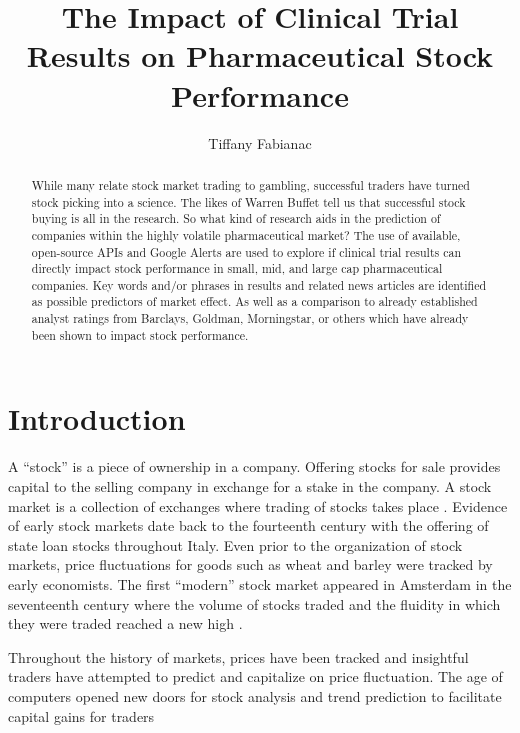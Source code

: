 \documentclass[sigconf]{acmart}
\begin{document}
\title{The Impact of Clinical Trial Results on Pharmaceutical Stock Performance}

\author{Tiffany Fabianac} 
 \renewcommand{\shortauthors}{T. Fabianac} 

\begin{abstract}
While many relate stock market trading to gambling, successful traders have turned stock picking into a science. The likes of Warren Buffet tell us that successful stock buying is all in the research. So what kind of research aids in the prediction of companies within the highly volatile pharmaceutical market? The use of available, open-source APIs and Google Alerts are used to explore if clinical trial results can directly impact stock performance in small, mid, and large cap pharmaceutical companies. Key words and/or phrases in results and related news articles are identified as possible predictors of market effect. As well as a comparison to already established analyst ratings from Barclays, Goldman, Morningstar, or others which have already been shown to impact stock performance.
\end{abstract}

\maketitle
\section{Introduction}
A ``stock'' is a piece of ownership in a company. Offering stocks for sale provides capital to the selling company in exchange for a stake in the company. A stock market is a collection of exchanges where trading of stocks takes place \cite{www-investopedia}. Evidence of early stock markets date back to the fourteenth century with the offering of state loan stocks throughout Italy. Even prior to the organization of stock markets, price fluctuations for goods such as wheat and barley were tracked by early economists. The first ``modern'' stock market appeared in Amsterdam in the seventeenth century where the volume of stocks traded and the fluidity in which they were traded reached a new high \cite{Braudel}. 

Throughout the history of markets, prices have been tracked and insightful traders have attempted to predict and capitalize on price fluctuation. The age of computers opened new doors for stock analysis and trend prediction to facilitate capital gains for traders
\end{document}
